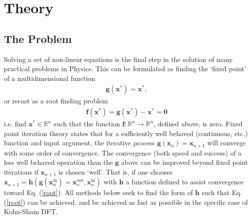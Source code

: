 
\chapter{Theory} %

\label{Chapter1} %


\section{The Problem}

\label{sec21}

Solving a set of non-linear equations is the final step in the solution of many practical problems in Physics. This can be formulated as finding the `fixed point' of a multidimensional function
\begin{align}
\textbf{g}(\textbf{x}^*) = \textbf{x}^*,
\end{align}
or recast as a root finding problem
\begin{align}
\label{root}
\textbf{f}(\textbf{x}^*) = \textbf{g}(\textbf{x}^*) - \textbf{x}^* = \textbf{0} 
\end{align}
i.e. find $\textbf{x}^* \in \mathbb{R}^n$ such that the function $\textbf{f} : \mathbb{R}^n \rightarrow \mathbb{R}^n$, defined above, is zero. Fixed point iteration theory states that for a sufficiently well behaved (continuous, etc.) function and input argument, the iterative process $\textbf{g}(\textbf{x}_n) = \textbf{x}_{n+1}$ will converge with some order of convergence. The convergence (both speed and success) of a less well behaved operation than the $\textbf{g}$ above can be improved beyond fixed point iterations if $\textbf{x}_{n+1}$ is chosen `well'. That is, if one chooses $\textbf{x}_{n+1} = \textbf{h}(\textbf{g}(\textbf{x}^{\text{in}}_n) = \textbf{x}^{\text{out}}_{n}, \textbf{x}_n^{\text{in}})$ with $\textbf{h}$ a function defined to assist convergence toward Eq$.$ (\ref{root}). All methods below seek to find the form of $\textbf{h}$ such that Eq$.$ (\ref{root}) can be achieved, and be achieved as fast as possible in the specific case of Kohn-Sham DFT.

